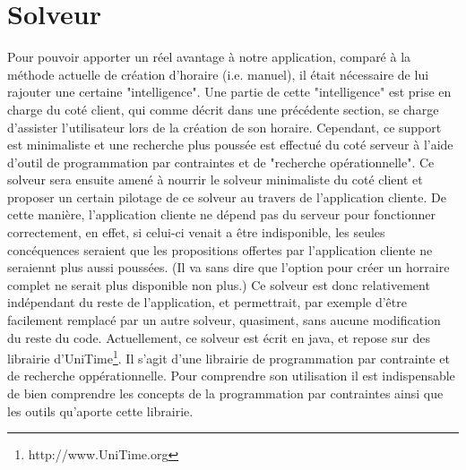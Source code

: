 \chapter{Solveur}




Pour pouvoir apporter un réel avantage à notre application, comparé à la méthode actuelle de création d'horaire (i.e. manuel), il était nécessaire de lui rajouter une certaine "intelligence". 
Une partie de cette "intelligence" est prise en charge du coté client, qui comme décrit dans une précédente section, se charge d'assister l'utilisateur lors de la création de son horaire.
\newline
\indent
Cependant, ce support est minimaliste et une recherche plus poussée est effectué du coté serveur à l'aide d'outil de programmation par contraintes et de "recherche opérationnelle".  Ce solveur sera ensuite amené à nourrir le solveur minimaliste du coté client et proposer un certain pilotage de ce solveur au travers de l'application cliente. 
De cette manière, l'application cliente ne dépend pas du serveur pour fonctionner correctement, en effet, si celui-ci venait a être indisponible, les seules concéquences seraient que les propositions offertes par l'application cliente ne seraiennt plus aussi poussées. 
(Il va sans dire que l'option pour créer un horraire complet ne serait plus disponible non plus.)
\newline
\indent
Ce solveur est donc relativement indépendant du reste de l'application, et permettrait, par exemple d'être facilement remplacé par un autre solveur, quasiment, sans aucune modification du reste du code.
Actuellement, ce solveur est écrit en java, et repose sur des librairie d'UniTime\footnote{http://www.UniTime.org}. Il s'agit d'une librairie de programmation par contrainte et de recherche oppérationnelle.
Pour comprendre son utilisation il est indispensable de bien comprendre les concepts de la programmation par contraintes ainsi que les outils qu'aporte cette librairie.


